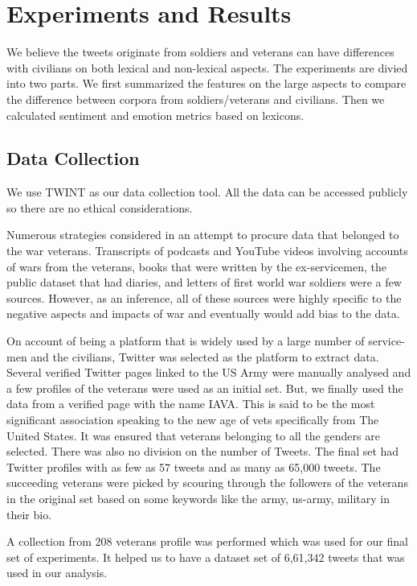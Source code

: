\section{Experiments and Results}

We believe the tweets originate from soldiers and veterans can have differences with civilians on both lexical and non-lexical aspects. The experiments are divied into two parts. We first summarized the features on the large aspects to compare the difference between corpora from soldiers/veterans and civilians. Then we calculated sentiment and emotion metrics based on lexicons.

\subsection{Data Collection}

We use TWINT \citep{twint} as our data collection tool. All the data can be accessed publicly so there are no ethical considerations.

Numerous strategies considered in an attempt to procure data that belonged to the war veterans. Transcripts of podcasts and YouTube videos involving accounts of wars from the veterans, books that were written by the ex-servicemen, the public dataset that had diaries, and letters of first world war soldiers were a few sources. However, as an inference, all of these sources were highly specific to the negative aspects and impacts of war and eventually would add bias to the data.

On account of being a platform that is widely used by a large number of service-men and the civilians, Twitter was selected as the platform to extract data. Several verified Twitter pages linked to the US Army were manually analysed and a few profiles of the veterans were used as an initial set. But, we finally used the data from a verified page with the name IAVA. This is said to be the most significant association speaking to the new age of vets specifically from The United States. It was ensured that veterans belonging to all the genders are selected. There was also no division on the number of Tweets. The final set had Twitter profiles with as few as 57 tweets and as many as 65,000 tweets. The succeeding veterans were picked by scouring through the followers of the veterans in the original set based on some keywords like the army, us-army, military in their bio.

A collection from 208 veterans profile was performed which was used for our final set of experiments. It helped us to have a dataset set of 6,61,342 tweets that was used in our analysis.

